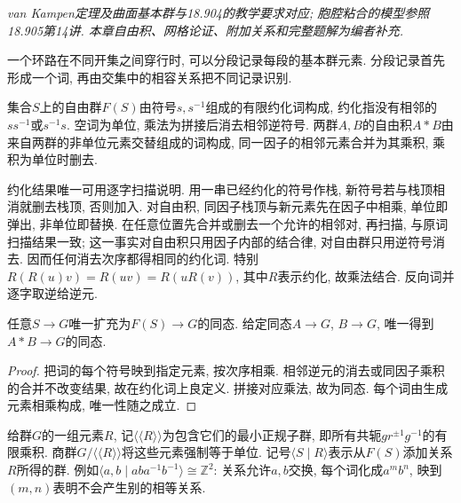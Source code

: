 \label{ch:vankampen}
\emph{van Kampen定理及曲面基本群与18.904的教学要求对应; 胞腔粘合的模型参照18.905第14讲. 本章自由积、网格论证、附加关系和完整题解为编者补充.}

一个环路在不同开集之间穿行时, 可以分段记录每段的基本群元素. 分段记录首先形成一个词, 再由交集中的相容关系把不同记录识别.
\begin{definition}
集合$S$上的自由群$F(S)$由符号$s,s^{-1}$组成的有限约化词构成, 约化指没有相邻的$s s^{-1}$或$s^{-1}s$. 空词为单位, 乘法为拼接后消去相邻逆符号. 两群$A,B$的自由积$A*B$由来自两群的非单位元素交替组成的词构成, 同一因子的相邻元素合并为其乘积, 乘积为单位时删去.
\end{definition}
约化结果唯一可用逐字扫描说明. 用一串已经约化的符号作栈, 新符号若与栈顶相消就删去栈顶, 否则加入. 对自由积, 同因子栈顶与新元素先在因子中相乘, 单位即弹出, 非单位即替换. 在任意位置先合并或删去一个允许的相邻对, 再扫描, 与原词扫描结果一致; 这一事实对自由积只用因子内部的结合律, 对自由群只用逆符号消去. 因而任何消去次序都得相同的约化词. 特别$R(R(u)v)=R(uv)=R(uR(v))$, 其中$R$表示约化, 故乘法结合. 反向词并逐字取逆给逆元.

\begin{proposition}\label{thm:free-universal}
任意$S\to G$唯一扩充为$F(S)\to G$的同态. 给定同态$A\to G$, $B\to G$, 唯一得到$A*B\to G$的同态.
\end{proposition}
\begin{proof}
把词的每个符号映到指定元素, 按次序相乘. 相邻逆元的消去或同因子乘积的合并不改变结果, 故在约化词上良定义. 拼接对应乘法, 故为同态. 每个词由生成元素相乘构成, 唯一性随之成立.
\end{proof}
给群$G$的一组元素$R$, 记$\langle\!\langle R\rangle\!\rangle$为包含它们的最小正规子群, 即所有共轭$g r^{\pm1}g^{-1}$的有限乘积. 商群$G/\langle\!\langle R\rangle\!\rangle$将这些元素强制等于单位. 记号$\langle S\mid R\rangle$表示从$F(S)$添加关系$R$所得的群. 例如$\langle a,b\mid aba^{-1}b^{-1}\rangle\cong\mathbb Z^2$: 关系允许$a,b$交换, 每个词化成$a^m b^n$, 映到$(m,n)$表明不会产生别的相等关系.

